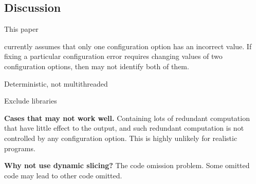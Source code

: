 

\subsection{Discussion}

This paper


\ourtool currently assumes that only one
configuration option has an incorrect value.
If fixing a particular configuration error
requires changing values of two configuration options,
then \ourtool may not identify both of them.


Deterministic, not multithreaded

Exclude libraries

\noindent \textbf{Cases that \ourtool may not work well.}
Containing lots of redundant computation that have
little effect to the output, and such redundant computation
is not controlled by any configuration option.
This is highly unlikely for realistic programs.

\noindent \textbf{Why not use dynamic slicing?} The code
omission problem. Some omitted code may lead to
other code omitted.


